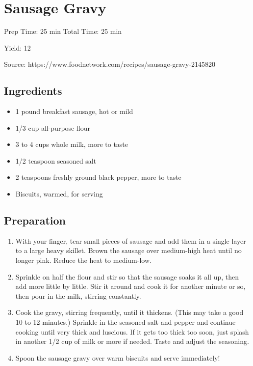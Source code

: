 \section{Sausage Gravy}

\begin{center}
Prep Time: 25 min
Total Time: 25 min

\noindent Yield: 12

\vspace{1em}

Source: https://www.foodnetwork.com/recipes/sausage-gravy-2145820
\end{center}

\subsection{Ingredients}
\begin{multicols}{2}
\begin{itemize}
    \item 1 pound breakfast sausage, hot or mild
    \item 1/3 cup all-purpose flour 
    \item 3 to 4 cups whole milk, more to taste 
    \item 1/2 teaspoon seasoned salt 
    \item 2 teaspoons freshly ground black pepper, more to taste 
    \item Biscuits, warmed, for serving
\end{itemize}
\end{multicols}

\subsection{Preparation}
\begin{enumerate}
    \item With your finger, tear small pieces of sausage and add them in a single layer to a large heavy skillet.
        Brown the sausage over medium-high heat until no longer pink. Reduce the heat to medium-low.
    \item Sprinkle on half the flour and stir so that the sausage soaks it all up, then add more little by little.
        Stir it around and cook it for another minute or so, then pour in the milk, stirring constantly.
    \item Cook the gravy, stirring frequently, until it thickens.
        (This may take a good 10 to 12 minutes.)
        Sprinkle in the seasoned salt and pepper and continue cooking until very thick and luscious.
        If it gets too thick too soon, just splash in another 1/2 cup of milk or more if needed.
        Taste and adjust the seasoning.
    \item Spoon the sausage gravy over warm biscuits and serve immediately!
\end{enumerate}

